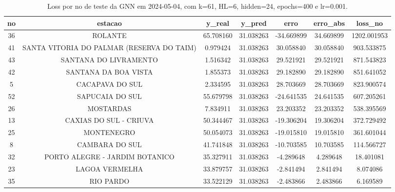 \begin{table}[h]
\centering
\caption{Loss por no de teste da GNN em 2024-05-04, com k=61, HL=6, hidden=24, epochs=400 e lr=0.001.}
\label{tab:gnn_loss_k61_hl6_h24_e400_d20240504}
\begin{tabular}{ccccccc}
\toprule
no & estacao & y\_real & y\_pred & erro & erro\_abs & loss\_no \\
\midrule
36 & ROLANTE & 65.708160 & 31.038263 & -34.669899 & 34.669899 & 1202.001953 \\
41 & SANTA VITORIA DO PALMAR (RESERVA DO TAIM) & 0.979424 & 31.038263 & 30.058840 & 30.058840 & 903.533875 \\
43 & SANTANA DO LIVRAMENTO & 1.516342 & 31.038263 & 29.521921 & 29.521921 & 871.543823 \\
42 & SANTANA DA BOA VISTA & 1.855373 & 31.038263 & 29.182890 & 29.182890 & 851.641052 \\
5 & CACAPAVA DO SUL & 2.334595 & 31.038263 & 28.703669 & 28.703669 & 823.900574 \\
52 & SAPUCAIA DO SUL & 55.679798 & 31.038263 & -24.641535 & 24.641535 & 607.205261 \\
26 & MOSTARDAS & 7.834911 & 31.038263 & 23.203352 & 23.203352 & 538.395569 \\
13 & CAXIAS DO SUL - CRIUVA & 50.344467 & 31.038263 & -19.306204 & 19.306204 & 372.729492 \\
25 & MONTENEGRO & 50.054073 & 31.038263 & -19.015810 & 19.015810 & 361.601044 \\
8 & CAMBARA DO SUL & 41.741848 & 31.038263 & -10.703585 & 10.703585 & 114.566727 \\
32 & PORTO ALEGRE - JARDIM BOTANICO & 35.327911 & 31.038263 & -4.289648 & 4.289648 & 18.401081 \\
23 & LAGOA VERMELHA & 33.879757 & 31.038263 & -2.841494 & 2.841494 & 8.074086 \\
35 & RIO PARDO & 33.522129 & 31.038263 & -2.483866 & 2.483866 & 6.169589 \\
\bottomrule
\end{tabular}
\end{table}
